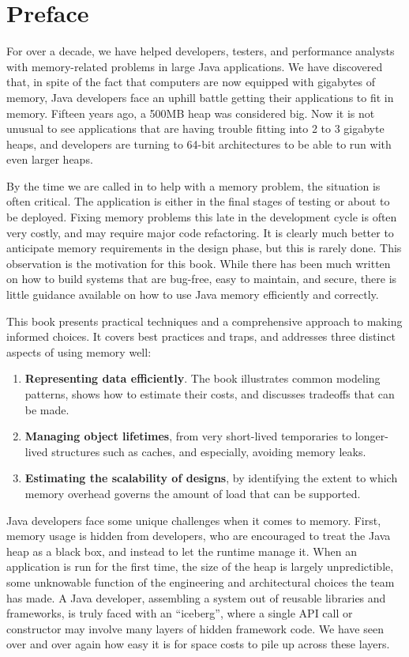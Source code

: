 \chapter*{Preface}
\label{chapter:preface}

For over a decade, we have helped developers, testers, and performance
analysts with memory-related problems in large Java applications.  
We have discovered that, in spite of the fact that computers are now equipped
with gigabytes of memory, Java developers face an uphill battle getting their applications to fit
in memory. Fifteen years ago, a 500MB heap was considered big.  Now it is not
unusual to see applications that are having trouble fitting into 2 to 3
gigabyte heaps, and developers are turning to 64-bit architectures to be able to
run with even larger heaps.

By the time we are called in to help with a memory problem, the situation
is often critical. The application is either in the final stages of testing or
about to be deployed. Fixing memory problems this late in the development cycle
is often very costly, and may require major code refactoring. It is clearly much
better to anticipate memory requirements in the design phase, but this is rarely
done. This observation is the motivation for this book. While there has
been much written on how to build systems that are bug-free, easy to maintain, and secure, there is
little guidance available on how to use Java memory efficiently and correctly.

This book presents practical techniques and a comprehensive approach to making
informed choices. It covers best practices and traps, and addresses three distinct aspects of using memory
well:
\begin{enumerate}
	\item \textbf{Representing data efficiently}. The book illustrates
	common modeling patterns, shows how to estimate their costs, and
	discusses tradeoffs that can be made.
	\item \textbf{Managing object lifetimes}, from very
	short-lived temporaries to longer-lived structures such as caches, and
	especially, avoiding memory leaks.
	\item \textbf{Estimating the scalability of designs}, by identifying the
	extent to which memory overhead governs the amount of load that can be
	supported.
\end{enumerate}

Java developers face some
unique challenges when it comes to memory.
First, memory usage is hidden from developers, who are
encouraged to treat the Java heap as a black box, and instead to let the runtime manage it. 
When an
application is run for the first time, the size of the heap is largely
unpredictible, some unknowable function of the engineering and architectural choices the team has made.
A Java developer, assembling a system out of reusable libraries and frameworks,
is truly faced with an ``iceberg'', where a single API call or constructor may
involve many layers of hidden framework code. We have seen over and over again
how easy it is for space costs to pile up across these layers.

